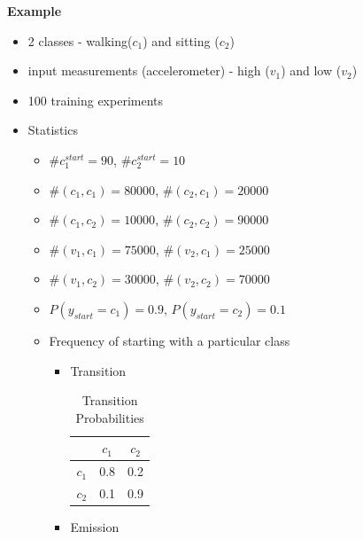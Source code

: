 \documentclass[parskip=half]{scrartcl}
\begin{document}
        \textbf{Example}
        \begin{itemize}
            \item 2 classes - walking($c_1$) and sitting ($c_2$)
            \item input measurements (accelerometer) - high ($v_1$) and low ($v_2$)
            \item 100 training experiments
            \item 
                Statistics
                \begin{itemize}
                    \item $\#c_1^{start} = 90$, $\#c_2^{start} = 10$
                    \item $\#(c_1, c_1) = 80000$, $\#(c_2, c_1) = 20000$
                    \item $\#(c_1, c_2) = 10000$, $\#(c_2, c_2) = 90000$
                    \item $\#(v_1, c_1) = 75000$, $\#(v_2, c_1) = 25000$
                    \item $\#(v_1, c_2) = 30000$, $\#(v_2, c_2) = 70000$
                    \item $P(y_{start} = c_1) = 0.9$, $P(y_{start} = c_2) = 0.1$
                    \item Frequency of starting with a particular class
                        \begin{itemize}
                            \item Transition
                            \begin{table}[ht]
                                \centering
                                \begin{tabular}{| l | c c |}
                                    \hline
                                    \textbf{} & \textbf{$c_1$} & \textbf{$c_2$} \\
                                    \hline\hline
                                        $c_1$ & 0.8 & 0.2 \\
                                    \hline
                                        $c_2$ & 0.1 & 0.9 \\
                                    \hline
                                \end{tabular}
                                \caption{Transition Probabilities}
                                \label{tab:transition_probabilities}
                            \end{table}
                            \item Emission

\end{itemize}
\end{itemize}
\end{itemize}
\end{document}

